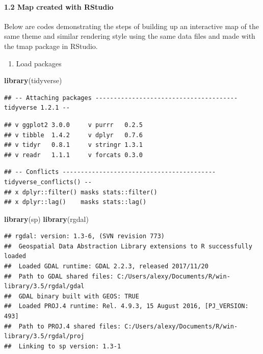 \documentclass[]{article}
\newenvironment{Shaded}{\begin{snugshade}}{\end{snugshade}}
\newcommand{\KeywordTok}[1]{\textcolor[rgb]{0.13,0.29,0.53}{\textbf{#1}}}
\newcommand{\NormalTok}[1]{#1}
\providecommand{\tightlist}{%
  \setlength{\itemsep}{0pt}\setlength{\parskip}{0pt}}
\let\oldparagraph\paragraph
\renewcommand{\paragraph}[1]{\oldparagraph{#1}\mbox{}}
\begin{document}
\paragraph{1.2 Map created with RStudio}\label{map-created-with-rstudio}

Below are codes demonstrating the steps of building up an interactive
map of the same theme and similar rendering style using the same data
files and made with the tmap package in RStudio.

\begin{enumerate}
\def\labelenumi{\roman{enumi})}
\tightlist
\item
  Load packages
\end{enumerate}

\begin{Shaded}
\begin{Highlighting}[]
\KeywordTok{library}\NormalTok{(tidyverse)}
\end{Highlighting}
\end{Shaded}

\begin{verbatim}
## -- Attaching packages --------------------------------------- tidyverse 1.2.1 --
\end{verbatim}

\begin{verbatim}
## v ggplot2 3.0.0     v purrr   0.2.5
## v tibble  1.4.2     v dplyr   0.7.6
## v tidyr   0.8.1     v stringr 1.3.1
## v readr   1.1.1     v forcats 0.3.0
\end{verbatim}

\begin{verbatim}
## -- Conflicts ------------------------------------------ tidyverse_conflicts() --
## x dplyr::filter() masks stats::filter()
## x dplyr::lag()    masks stats::lag()
\end{verbatim}

\begin{Shaded}
\begin{Highlighting}[]
\KeywordTok{library}\NormalTok{(sp)}
\KeywordTok{library}\NormalTok{(rgdal)}
\end{Highlighting}
\end{Shaded}

\begin{verbatim}
## rgdal: version: 1.3-6, (SVN revision 773)
##  Geospatial Data Abstraction Library extensions to R successfully loaded
##  Loaded GDAL runtime: GDAL 2.2.3, released 2017/11/20
##  Path to GDAL shared files: C:/Users/alexy/Documents/R/win-library/3.5/rgdal/gdal
##  GDAL binary built with GEOS: TRUE 
##  Loaded PROJ.4 runtime: Rel. 4.9.3, 15 August 2016, [PJ_VERSION: 493]
##  Path to PROJ.4 shared files: C:/Users/alexy/Documents/R/win-library/3.5/rgdal/proj
##  Linking to sp version: 1.3-1
\end{verbatim}
\end{document}
